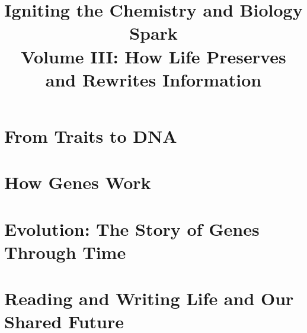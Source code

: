 \documentclass[12pt,openany,fontset=none,UTF8,scheme=chinese]{ctexbook}
\title{Igniting the Chemistry and Biology Spark\\Volume III: How Life Preserves and Rewrites Information}
\author{}
\date{}
\begin{document}
\frontmatter
\maketitle
\tableofcontents

\mainmatter
\setcounter{part}{7}
\setcounter{chapter}{62}

\part{From Traits to DNA}





\part{How Genes Work}










\part{Evolution: The Story of Genes Through Time}






\part{Reading and Writing Life and Our Shared Future}








\appendix

\backmatter
\end{document}
